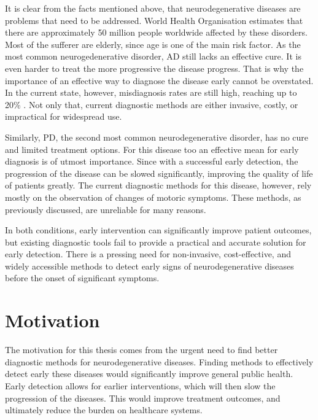It is clear from the facts mentioned above, that neurodegenerative diseases are problems that need to be addressed.
World Health Organisation estimates that there are approximately 50 million people worldwide affected by these disorders.
Most of the sufferer are elderly, since age is one of the main risk factor.
As the most common neurogedenerative disorder, \ac{AD} still lacks an effective cure.
It is even harder to treat the more progressive the disease progress.
That is why the importance of an effective way to diagnose the disease early cannot be overstated. 
In the current state, however, misdiagnosis rates are still high, reaching up to 20\% \cite{Fischer2017}.
Not only that, current diagnostic methods are either invasive, costly, or impractical for widespread use.

Similarly, \ac{PD}, the second most common neurodegenerative disorder, has no cure and limited treatment options. 
For this disease too an effective mean for early diagnosis is of utmost importance.
Since with a successful early detection, the progression of the disease can be slowed significantly, improving the quality of life of patients greatly.
The current diagnostic methods for this disease, however, rely mostly on the observation of changes of motoric symptoms.
These methods, as previously discussed, are unreliable for many reasons.

In both conditions, early intervention can significantly improve patient outcomes, but existing diagnostic tools fail to provide a practical and accurate solution for early detection. 
There is a pressing need for non-invasive, cost-effective, and widely accessible methods to detect early signs of neurodegenerative diseases before the onset of significant symptoms.

\section{Motivation}


The motivation for this thesis comes from the urgent need to find better diagnostic methods for neurodegenerative diseases. 
Finding methods to effectively detect early these diseases would significantly improve general public health.
Early detection allows for earlier interventions, which will then slow the progression of the diseases.
This would improve treatment outcomes, and ultimately reduce the burden on healthcare systems.


